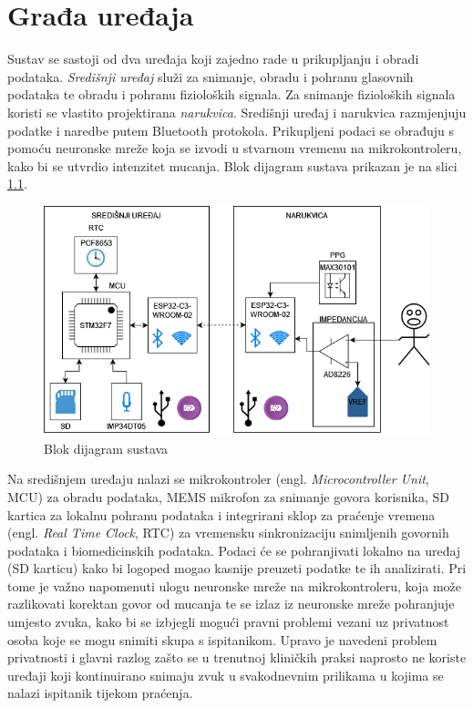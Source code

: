 \chapter{Građa uređaja}
\label{pog:structure}

Sustav se sastoji od dva uređaja koji zajedno rade u prikupljanju i obradi podataka. \textit{Središnji uređaj} služi za snimanje, obradu i pohranu glasovnih podataka te obradu i pohranu fizioloških signala. Za snimanje fizioloških signala koristi se vlastito projektirana \textit{narukvica}. Središnji uređaj i narukvica razmjenjuju podatke i naredbe putem Bluetooth protokola. Prikupljeni podaci se obrađuju s pomoću neuronske mreže koja se izvodi u stvarnom vremenu na mikrokontroleru, kako bi se utvrdio intenzitet mucanja. Blok dijagram sustava prikazan je na slici \ref{slk:BD_MAIN}.
\begin{figure}[htb]
    \centering
    \includegraphics[width=\textwidth]{Figures/block_diagram.drawio.png}
    \caption{Blok dijagram sustava}
    \label{slk:BD_MAIN}
\end{figure}

Na središnjem uređaju nalazi se mikrokontroler (engl. \textit{Microcontroller Unit}, MCU) za obradu podataka, MEMS mikrofon za snimanje govora korisnika, SD kartica za lokalnu pohranu podataka i integrirani sklop za praćenje vremena (engl. \textit{Real Time Clock}, RTC) za vremensku sinkronizaciju snimljenih govornih podataka i biomedicinskih podataka. Podaci će se pohranjivati lokalno na uređaj (SD karticu) kako bi logoped mogao kasnije preuzeti podatke te ih analizirati. Pri tome je važno napomenuti ulogu neuronske mreže na mikrokontroleru, koja može razlikovati korektan govor od mucanja te se izlaz iz neuronske mreže pohranjuje umjesto zvuka, kako bi se izbjegli mogući pravni problemi vezani uz privatnost osoba koje se mogu snimiti skupa s ispitanikom. Upravo je navedeni problem privatnosti i glavni razlog zašto se u trenutnoj kliničkih praksi naprosto ne koriste uređaji koji kontinuirano snimaju zvuk u svakodnevnim prilikama u kojima se nalazi ispitanik tijekom praćenja.

